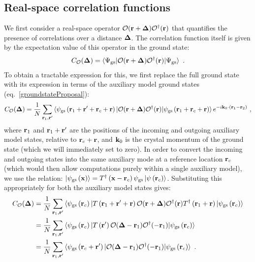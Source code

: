 \documentclass[reprint,hidelinks,onecolumn]{revtex4-2}
\begin{document}
\subsection{Real-space correlation functions}
We first consider a real-space operator \(\mathcal{O}({\bf r} + {\bf \Delta})\mathcal{O}^\dagger({\bf r})\) that quantifies the presence of correlations over a distance \({\bf \Delta}\). The correlation function itself is given by the expectation value of this operator in the ground state:
\begin{equation}\begin{aligned}
	C_{\mathcal{O}}({\bf \Delta}) = \braket{\Psi_\text{gs} | \mathcal{O}({\bf r} + {\bf \Delta})\mathcal{O}^\dagger({\bf r}) | \Psi_\text{gs}}~.
\end{aligned}\end{equation}
To obtain a tractable expression for this, we first replace the full ground state with its expression in terms of the auxiliary model ground states (eq.~\ref{groundstateProposal}):
\begin{equation}\begin{aligned}
	C_{\mathcal{O}}({\bf \Delta}) = \frac{1}{N}\sum_{{\bf r}_1,{\bf r}^\prime}\braket{\psi_\text{gs}\left({\bf r}_1 + {\bf r}^\prime + {\bf r}_c + {\bf r}\right)  | \mathcal{O}({\bf r} + {\bf \Delta})\mathcal{O}^\dagger({\bf r}) | \psi_\text{gs}\left({\bf r}_1 + {\bf r}_c + {\bf r}\right)} e^{-i{\bf k}_0\cdot\left({\bf r}_1 - {\bf r}_2\right)}~,
\end{aligned}\end{equation}
where \({\bf r}_1\) and \({\bf r}_1 + {\bf r}^\prime\) are the positions of the incoming and outgoing auxiliary model states, relative to \({\bf r}_c + {\bf r}\), and \({\bf k}_0\) is the crystal momentum of the ground state (which we will immediately set to zero). In order to convert the incoming and outgoing states into the same auxiliary mode at a reference location \({\bf r}_c\) (which would then allow computations purely within a single auxiliary model), we use the relation: \(\ket{\psi_\text{gs}\left({\bf x}\right)} = T^\dagger\left({\bf x} - {\bf r}_c\right)\psi_\text{gs}\ket{\psi\left({\bf r}_c \right)}\). Substituting this appropriately for both the auxiliary model states gives:
\begin{equation}\begin{aligned}
	C_{\mathcal{O}}({\bf \Delta}) &= \frac{1}{N}\sum_{{\bf r}_1,{\bf r}^\prime}\braket{\psi_\text{gs}\left({\bf r}_c\right) | T\left({\bf r}_1 + {\bf r}^\prime + {\bf r}\right) \mathcal{O}({\bf r} + {\bf \Delta})\mathcal{O}^\dagger({\bf r}) T^\dagger\left({\bf r}_1 + {\bf r}\right) | \psi_\text{gs}\left({\bf r}_c\right)}\\
								  &= \frac{1}{N}\sum_{{\bf r}_1,{\bf r}^\prime}\braket{\psi_\text{gs}\left({\bf r}_c\right) | T\left({\bf r}^\prime\right) \mathcal{O}({\bf \Delta} - {\bf r}_1) \mathcal{O}^\dagger(- {\bf r}_1) | \psi_\text{gs}\left({\bf r}_c\right)}\\
								  &= \frac{1}{N}\sum_{{\bf r}_1,{\bf r}^\prime}\braket{\psi_\text{gs}\left({\bf r}_c + {\bf r}^\prime\right) | \mathcal{O}({\bf \Delta} - {\bf r}_1) \mathcal{O}^\dagger(- {\bf r}_1) | \psi_\text{gs}\left({\bf r}_c\right)}~.
\end{aligned}\end{equation}
\end{document}
